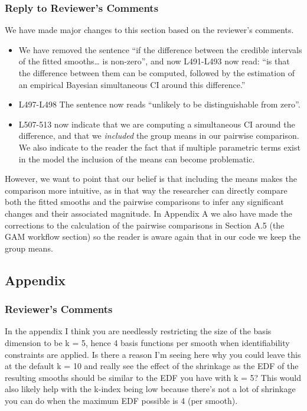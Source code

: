 \documentclass[
]{article}
\begin{document}
\hypertarget{section-9}{%
\subsubsection{\texorpdfstring{\textcolor{reviewersblue} {Reply to Reviewer's Comments}}{}}\label{section-9}}

We have made major changes to this section based on the reviewer's comments.

\begin{itemize}
\item
  We have removed the sentence ``if the difference between the credible intervals of the fitted smooths\ldots{} is non-zero'', and now L491-L493 now read: ``is that the difference between them can be computed, followed by the estimation of an empirical Bayesian simultaneous CI around this difference.''
\item
  L497-L498 The sentence now reads ``unlikely to be distinguishable from zero''.
\item
  L507-513 now indicate that we are computing a simultaneous CI around the difference, and that we \emph{included} the group means in our pairwise comparison. We also indicate to the reader the fact that if multiple parametric terms exist in the model the inclusion of the means can become problematic.
\end{itemize}

However, we want to point that our belief is that including the means makes the comparison more intuitive, as in that way the researcher can directly compare both the fitted smooths and the pairwise comparisons to infer any significant changes and their associated magnitude. In Appendix A we also have made the corrections to the calculation of the pairwise comparisons in Section A.5 (the GAM workflow section) so the reader is aware again that in our code we keep the group means.

\hypertarget{appendix}{%
\subsection{Appendix}\label{appendix}}

\hypertarget{reviewers-comments-9}{%
\subsubsection{Reviewer's Comments}\label{reviewers-comments-9}}

In the appendix I think you are needlessly restricting the size of the basis dimension to be k = 5, hence 4 basis functions per smooth when identifiability constraints are applied. Is there a reason I'm seeing here why you could leave this at the default k = 10 and really see the effect of the shrinkage as the EDF of the resulting smooths should be similar to the EDF you have with k = 5? This would also likely help with the k-index being low because there's not a lot of shrinkage you can do when the maximum EDF possible is 4 (per smooth).
\end{document}
